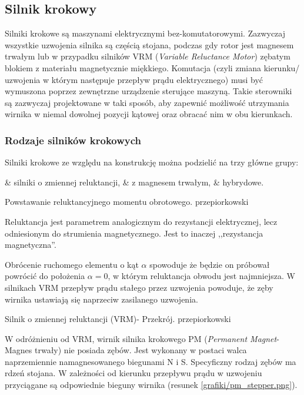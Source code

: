 \subsection{Silnik krokowy}

Silniki krokowe są maszynami elektrycznymi bez-komutatorowymi. Zazwyczaj wszystkie uzwojenia silnika są częścią stojana, podczas gdy rotor jest magnesem trwałym lub w przypadku silników VRM ({\em Variable Reluctance Motor}) zębatym blokiem z materiału magnetycznie miękkiego. Komutacja (czyli zmiana kierunku/ uzwojenia w którym następuje przepływ prądu elektrycznego) musi być wymuszona poprzez zewnętrzne urządzenie sterujące maszyną. Takie sterowniki są zazwyczaj projektowane w taki sposób, aby zapewnić możliwość utrzymania wirnika w niemal dowolnej pozycji kątowej oraz obracać nim w obu kierunkach. 

\subsubsection{Rodzaje silników krokowych}

Silniki krokowe ze względu na konstrukcję można podzielić na trzy główne grupy: 
\begin{easylist}
	& silniki o zmiennej reluktancji,
	& z magnesem trwałym,
	& hybrydowe.
\end{easylist}

		{Powstawanie reluktancyjnego momentu obrotowego.}
		{przepiorkowski}

Reluktancja jest parametrem analogicznym do rezystancji elektrycznej, lecz odniesionym do strumienia magnetycznego. Jest to inaczej ,,rezystancja magnetyczna''.

Obrócenie ruchomego elementu o kąt $ \alpha $ spowoduje że będzie on próbował powrócić do położenia $ \alpha = 0 $, w którym reluktancja obwodu jest najmniejsza. W silnikach VRM przepływ prądu stałego przez uzwojenia powoduje, że zęby wirnika ustawiają się naprzeciw zasilanego uzwojenia.

		{Silnik o zmiennej reluktancji (VRM)- Przekrój.}
		{przepiorkowski}

W odróżnieniu od VRM, wirnik silnika krokowego PM ({\em Permanent Magnet}- Magnes trwały) nie posiada zębów. Jest wykonany w postaci walca naprzemiennie namagnesowanego biegunami N i S. Specyficzny rodzaj zębów ma rdzeń stojana. \newline
W zależności od kierunku przepływu prądu w uzwojeniu przyciągane są odpowiednie bieguny wirnika (resunek \ref{grafiki/pm_stepper.png}).


